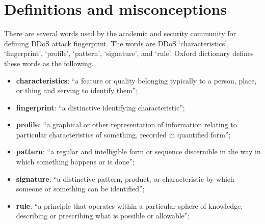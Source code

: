 \section{Definitions and misconceptions}

There are several words used by the academic and security community for defining DDoS attack fingerprint. The words are DDoS `characteristics', `fingerprint', `profile', `pattern', `signature', and `rule'. Oxford dictionary defines these words as the following.

\begin{itemize}
	\item \textbf{characteristics}: ``a feature or quality belonging typically to a person, place, or thing and serving to identify them'';
	\item \textbf{fingerprint}: ``a distinctive identifying characteristic'';
	\item \textbf{profile}: ``a graphical or other representation of information relating to particular characteristics of something, recorded in quantified form'';
	\item \textbf{pattern}: ``a regular and intelligible form or sequence discernible in the way in which something happens or is done'';
	\item \textbf{signature}: ``a distinctive pattern, product, or characteristic by which someone or something can be identified'';
	\item \textbf{rule}: ``a principle that operates within a particular sphere of knowledge, describing or prescribing what is possible or allowable'';
\end{itemize}











 
